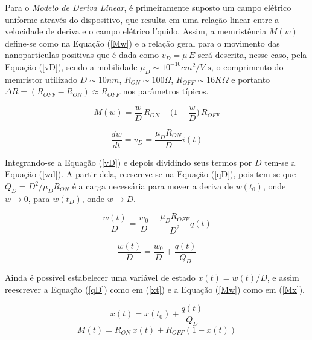 \documentclass{ceel}
\begin{document}
\begin{multicols}{2}
Para o \emph{Modelo de Deriva Linear}, é primeiramente suposto um campo elétrico uniforme através do dispositivo, que resulta em uma relação linear entre a velocidade de deriva e o campo elétrico líquido. Assim, a memristência $M(w)$ define-se como na Equação (\ref{Mw}) e a relação geral para o movimento das nanopartículas positivas que é dada como $v_D=\mu\, E$ será descrita, nesse caso, pela Equação (\ref{vD}), sendo a mobilidade $\mu_D \sim 10^{-10} cm^2/V.s$, o comprimento do memristor utilizado $D\sim10nm$, $R_{ON}\sim 100\Omega$, $R_{OFF}\sim 16K\Omega$ e portanto $\Delta R = (R_{OFF} - R_{ON}) \approx R_{OFF}$ nos parâmetros típicos.
\columnbreak

\begin{equation}\label{Mw}
M(w)=\dfrac{w}{D}\, R_{ON}+\Big(1 - \dfrac{w}{D}\Big)\, R_{OFF}
\end{equation}

\begin{equation}\label{vD}
\dfrac{dw}{dt}=v_D=\dfrac{\mu_D R_{ON}}{D}i(t)
\end{equation}
\vspace{0.05cm}

Integrando-se a Equação (\ref{vD}) e depois dividindo seus termos por $D$ tem-se a Equação (\ref{wd}).
A partir dela, reescreve-se na Equação (\ref{qD}), pois tem-se que $Q_D=D^2/\mu_D R_{ON}$ é a carga necessária para mover a deriva de $w(t_0)$, onde $w\rightarrow 0$, para $w(t_D)$, onde $w\rightarrow D$.

\begin{equation}\label{wd}
\dfrac{w(t)}{D}=\dfrac{w_0}{D}+\dfrac{\mu_D R_{OFF}}{D^2}q(t)
\end{equation}

\begin{equation}\label{qD}
\dfrac{w(t)}{D}=\dfrac{w_0}{D}+\dfrac{q(t)}{Q_D}
\end{equation}
\vspace{0.04cm}

Ainda é possível estabelecer uma variável de estado $x(t)=w(t)/D$, e assim reescrever a Equação (\ref{qD}) como em (\ref{xt}) e a Equação (\ref{Mw}) como em (\ref{Mx}).

\begin{equation}\label{xt}
x(t)=x(t_0)+\dfrac{q(t)}{Q_D}
\end{equation}
\begin{equation}\label{Mx}
M(t)=R_{ON}\ x(t)+ R_{OFF}(1-x(t))
\end{equation}
\vspace{0.001cm}


\end{multicols}
\end{document}
